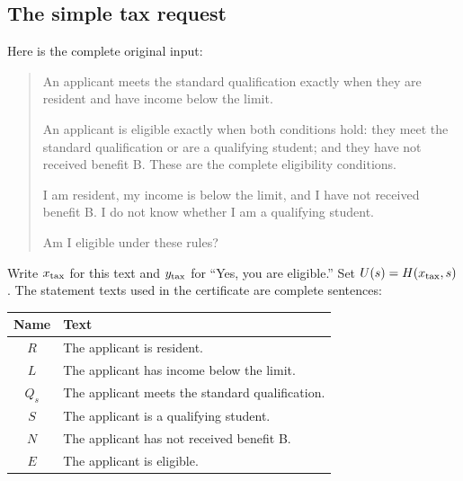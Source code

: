 \documentclass[11pt,twoside]{article}
\theoremstyle{definition}
\begin{document}
\subsection{The simple tax request}
\label{sec:simple-tax}

Here is the complete original input:
\begin{quote}
An applicant meets the standard qualification exactly when they are resident
and have income below the limit.

An applicant is eligible exactly when both conditions hold: they meet the
standard qualification or are a qualifying student; and they have not
received benefit B. These are the complete eligibility conditions.

I am resident, my income is below the limit, and I have not received benefit B.
I do not know whether I am a qualifying student.

Am I eligible under these rules?
\end{quote}
Write $x_{\rm tax}$ for this text and $y_{\rm tax}$ for ``Yes, you are
eligible.'' Set $U(s)=H(x_{\rm tax},s)$. The statement texts used in the
certificate are complete sentences:
\begin{center}
\begin{tabular}{cl}
\toprule
Name & Text\\
\midrule
$R$ & The applicant is resident.\\
$L$ & The applicant has income below the limit.\\
$Q_s$ & The applicant meets the standard qualification.\\
$S$ & The applicant is a qualifying student.\\
$N$ & The applicant has not received benefit B.\\
$E$ & The applicant is eligible.\\
\bottomrule
\end{tabular}
\end{center}
\end{document}
